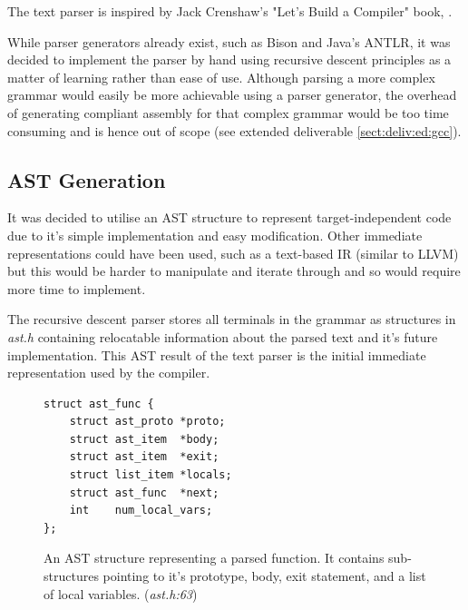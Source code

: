 \documentclass[11pt,a4paper]{report}
\begin{document}
The text parser is inspired by Jack Crenshaw's "Let's Build a Compiler" book, \cite{crenshaw1988let}.

While parser generators already exist, such as Bison and Java's ANTLR, it was decided to implement the parser by hand using recursive descent principles as a matter of learning rather than ease of use. Although parsing a more complex grammar would easily be more achievable using a parser generator, the overhead of generating compliant assembly for that complex grammar would be too time consuming and is hence out of scope (see extended deliverable \ref{sect:deliv:ed:gcc}).

\subsection{AST Generation}
\label{sect:compiler_ast}
It was decided to utilise an AST structure to represent target-independent code due to it's simple implementation and easy modification. Other immediate representations could have been used, such as a text-based IR (similar to LLVM) but this would be harder to manipulate and iterate through and so would require more time to implement.

The recursive descent parser stores all terminals in the grammar as structures in \textit{ast.h} containing relocatable information about the parsed text and it's future implementation. This AST result of the text parser is the initial immediate representation used by the compiler.

\begin{figure}[H]
\centering 
\begin{minipage}{0.4\textwidth}
\begin{verbatim}
struct ast_func {
    struct ast_proto *proto;
    struct ast_item  *body;
    struct ast_item  *exit;
    struct list_item *locals;
    struct ast_func  *next;
    int    num_local_vars;
};
\end{verbatim}
\end{minipage}
\caption{An AST structure representing a parsed function. It contains sub-structures pointing to it's prototype, body, exit statement, and a list of local variables. (\textit{ast.h:63})}
\end{figure}
\end{document}

